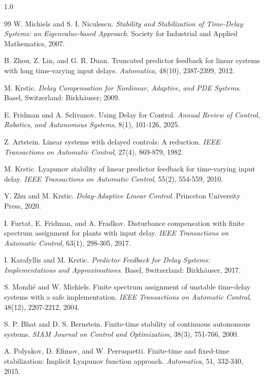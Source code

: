 \documentclass[journal]{IEEEtran}
\begin{document}
\begin{spacing}{1.0}
\begin{thebibliography}{99}
W. Michiels and S. I. Niculescu. \textit{Stability and
Stabilization of Time-Delay Systems: an Eigenvalue-based Approach}. Society
for Industrial and Applied Mathematics, 2007.

B. Zhou, Z. Lin, and G. R. Duan. Truncated predictor
feedback for linear systems with long time-varying input delays.
\textit{Automatica}, 48(10), 2387-2399, 2012.

M. Krstic. \textit{Delay Compensation for Nonlinear,
Adaptive, and PDE Systems}. Basel, Switzerland: Birkh\"{a}user; 2009.

E. Fridman and A. Selivanov. Using Delay for Control.
\textit{Annual Review of Control, Robotics, and Autonomous Systems}, 8(1),
101-126, 2025.

Z. Artstein. Linear systems with delayed controls: A
reduction. \textit{IEEE Transactions on Automatic Control}, 27(4), 869-879,
1982.

M. Krstic. Lyapunov stability of linear predictor
feedback for time-varying input delay. \textit{IEEE Transactions on Automatic
Control}, 55(2), 554-559, 2010.

Y. Zhu and M. Krstic. \textit{Delay-Adaptive Linear
Control}. Princeton University Press, 2020.

I. Furtat, E. Fridman, and A. Fradkov. Disturbance
compensation with finite spectrum assignment for plants with input delay.
\textit{IEEE Transactions on Automatic Control}, 63(1), 298-305, 2017.

I. Karafyllis and M. Krstic. \textit{Predictor Feedback
for Delay Systems: Implementations and Approximations}. Basel, Switzerland:
Birkh\"{a}user, 2017.

S. Mondi\'{e} and W. Michiels. Finite spectrum assignment
of unstable time-delay systems with a safe implementation. \textit{IEEE
Transactions on Automatic Control}, 48(12), 2207-2212, 2004.

S. P. Bhat and D. S. Bernstein. Finite-time stability of
continuous autonomous systems. \textit{SIAM Journal on Control and
Optimization}, 38(3), 751-766, 2000.

A. Polyakov, D. Efimov, and W. Perruquetti. Finite-time
and fixed-time stabilization: Implicit Lyapunov function approach.
\textit{Automatica}, 51, 332-340, 2015.


\end{thebibliography}
\end{spacing}
\end{document}
